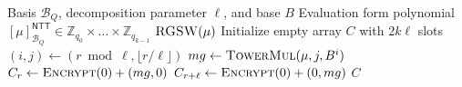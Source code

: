 \begin{algorithm}
\caption{Parallel RGSW-BV Encryption}
\label{alg:bv:encrypt}
\begin{algorithmic}[1]
\Require Basis $\mathcal{B}_Q$, decomposition parameter $\ell$, and base $B$
\Require Evaluation form polynomial $[\mu]^{\mathsf{NTT}}_{\mathcal{B}_Q} \in \mathbb{Z}_{q_0} \times \dots \times  \mathbb{Z}_{q_{k-1}}$
\Ensure $\Call{RGSW}{\mu}$
\State Initialize empty array $C$ with $2k\ell$ slots
\For{$r \gets [0, k\ell)$ \textbf{in parallel}}
    \State $(i, j) \gets (r\bmod{\ell}, \lfloor r/\ell \rfloor)$
    \State $mg \gets \Call{TowerMul}{\mu, j, B^i}$
    \State $C_r \gets \Call{Encrypt}{0} + (mg, 0) $
    \State $C_{r + \ell} \gets \Call{Encrypt}{0} + (0, mg)$
\EndFor
\State \Return $C$
\end{algorithmic}
\end{algorithm}